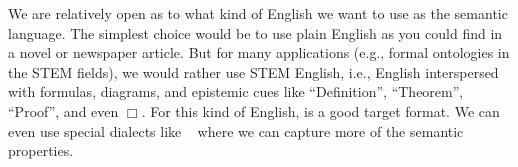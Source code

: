 %

\begin{remark}
We are relatively open as to what kind of English we want to use as the semantic language.
The simplest choice would be to use plain English as you could find in a novel or newspaper article.
But for many applications (e.g., formal ontologies in the STEM fields), we would rather use STEM English, i.e., English interspersed with formulas, diagrams, and epistemic cues like ``Definition'', ``Theorem'', ``Proof'', and even $\Box$.
For this kind of English, \latex is a good target format.
We can even use special \latex dialects like \sTeX~\cite{stex} where we can capture more of the semantic properties.
\end{remark}


